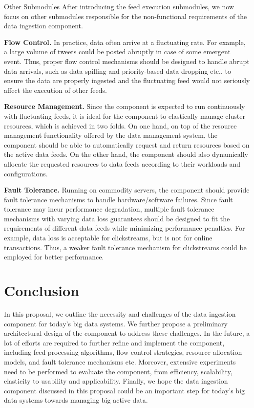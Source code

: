 \documentclass[conference]{llncs}
\makeatletter
\renewcommand\subsubsection{\@startsection{subsubsection}{3}{0mm} 
{-\baselineskip} 
{1\baselineskip} 
{\normalfont\normalsize\bfseries} 
}
\makeatother
\begin{document}
\subsubsection{Other Submodules}
After introducing the feed execution submodules, we now focus on other submodules responsible for the non-functional requirements of the data ingestion component.

\textbf{Flow Control.}
In practice, data often arrive at a fluctuating rate.
For example, a large volume of tweets could be posted abruptly in case of some emergent event.
Thus, proper flow control mechanisms should be designed to handle abrupt data arrivals, such as data spilling and priority-based data dropping etc., to ensure the data are properly ingested and the fluctuating feed would not seriously affect the execution of other feeds.

\textbf{Resource Management.}
Since the component is expected to run continuously with fluctuating feeds, it is ideal for the component to elastically manage cluster resources, which is achieved in two folds.
On one hand, on top of the resource management functionality offered by the data management system, the component should be able to automatically request and return resources based on the active data feeds.
On the other hand, the component should also dynamically allocate the requested resources to data feeds according to their workloads and configurations.

\textbf{Fault Tolerance.}
Running on commodity servers, the component should provide fault tolerance mechanisms to handle hardware/software failures.
Since fault tolerance may incur performance degradation, multiple fault tolerance mechanisms with varying data loss guarantees should be designed to fit the requirements of different data feeds while minimizing performance penalties.
For example, data loss is acceptable for clickstreams, but is not for online transactions.
Thus, a weaker fault tolerance mechanism for clickstreams could be employed for better performance.

\section{Conclusion}
\label{sec:conclusion}
In this proposal, we outline the necessity and challenges of the data ingestion component for today's big data systems.
We further propose a preliminary architectural design of the component to address these challenges.
In the future, a lot of efforts are required to further refine and implement the component, including feed processing algorithms, flow control strategies, resource allocation models, and fault tolerance mechanisms etc.
Moreover, extensive experiments need to be performed to evaluate the component, from efficiency, scalability, elasticity to usability and applicability.
Finally, we hope the data ingestion component discussed in this proposal could be an important step for today's big data systems towards managing big active data.



\end{document}
